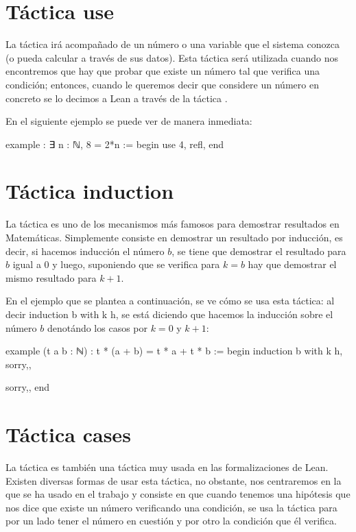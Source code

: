 \section{Táctica use}
La táctica  irá acompañado de un número o una variable que
el sistema conozca (o pueda calcular a través de sus datos). Esta táctica será
utilizada cuando nos encontremos que hay que probar que existe un número tal
que verifica una condición; entonces, cuando le queremos decir que considere un
número en concreto se lo decimos a Lean a través de la táctica
.

En el siguiente ejemplo se puede ver de manera inmediata:

\begin{leancode}
example : ∃ n : ℕ, 8 = 2*n :=
begin
  use 4,
  refl,
end
\end{leancode}


\section{Táctica induction}
La táctica  es uno de los mecanismos más famosos
para demostrar resultados en Matemáticas. Simplemente consiste en demostrar
un resultado por inducción, es decir, si hacemos inducción el número \(b\),
se tiene que demostrar el resultado para \(b\) igual a \(0\) y luego, suponiendo
que se verifica para \(k=b\) hay que demostrar el mismo resultado para \(k+1\).

En el ejemplo que se plantea a continuación, se ve cómo se usa esta táctica:
al decir induction b with k h, se está diciendo que hacemos la inducción sobre
el número \(b\) denotándo los casos por \(k=0\) y \(k+1\):

\begin{leancode}
example (t a b : ℕ) : t * (a + b) = t * a + t * b :=
begin
induction b with k h,
{sorry,},

{sorry,},
end
\end{leancode}

\section{Táctica cases}
La táctica  es también una táctica muy usada en las
formalizaciones de Lean. Existen diversas formas de usar esta táctica, no
obstante, nos centraremos en la que se ha usado en el trabajo y consiste en que
cuando tenemos una hipótesis que nos dice que existe un número verificando una
condición, se usa la táctica  para por un lado tener el
número en cuestión y por otro la condición que él verifica.


